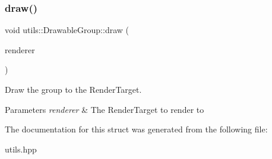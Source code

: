 \subsubsection{\texorpdfstring{draw()}{draw()}}
{\footnotesize\ttfamily void utils\+::\+Drawable\+Group\+::draw (\begin{DoxyParamCaption}\item[{\mbox{\hyperlink{classsf_1_1_render_target}{sf\+::\+Render\+Target}} \&}]{renderer }\end{DoxyParamCaption})\hspace{0.3cm}{\ttfamily [inline]}}



Draw the group to the Render\+Target. 


\begin{DoxyParams}{Parameters}
{\em renderer} & The Render\+Target to render to \\
\hline
\end{DoxyParams}


The documentation for this struct was generated from the following file\+:\begin{DoxyCompactItemize}
\item 
utils.\+hpp\end{DoxyCompactItemize}
